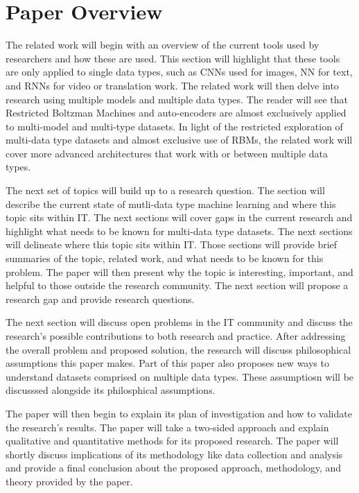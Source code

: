 \chapter{Paper Overview}
The related work will begin with an overview of the current tools used by researchers and how these are used.  This section will highlight that these tools are only applied to single data types, such as CNNs used for images, NN for text, and RNNs for video or translation work.  The related work will then delve into research using multiple models and multiple data types.  The reader will see that Restricted Boltzman Machines and auto-encoders are almost exclusively applied to multi-model and multi-type datasets.  In light of the restricted exploration of multi-data type datasets and almost exclusive use of RBMs, the related work will cover more advanced architectures that work with or between multiple data types.

The next set of topics will build up to a research question.  The section will describe the current state of mutli-data type machine learning and where this topic sits within IT.  The next sections will cover gaps in the current research and highlight what needs to be known for multi-data type datasets.  The next sections will delineate where this topic sits within IT.  Those sections will provide brief summaries of the topic, related work, and what needs to be known for this problem.  The paper will then present why the topic is interesting, important, and helpful to those outside the research community.  The next section will propose a research gap and provide research questions.

The next section will discuss open problems in the IT community and discuss the research's possible contributions to both research and practice.  After addressing the overall problem and proposed solution, the research will discuss philosophical assumptions this paper makes.  Part of this paper also proposes new ways to understand datasets comprised on multiple data types.  These assumptiosn will be discusssed alongside its philosphical assumptions.

The paper will then begin to explain its plan of investigation and how to validate the research's results.  The paper will take a two-sided approach and explain qualitative and quantitative methods for its proposed research.  The paper will shortly discuss implications of its methodology like data collection and analysis and provide a final conclusion about the proposed approach, methodology, and theory provided by the paper.
